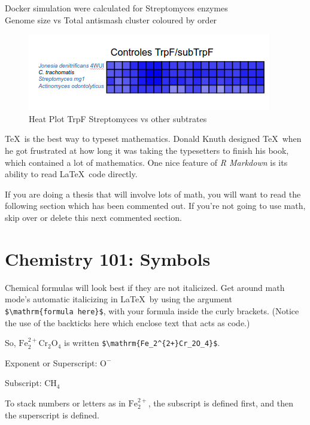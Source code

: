 \documentclass[12pt,twoside]{reedthesis}
\begin{document}
  Docker simulation were calculated for Streptomyces enzymes\\
  Genome size vs Total antismash cluster coloured by order
  
  \begin{figure}[h!tbp]
  \centering
  \includegraphics[angle = 0,scale = 0.6]{chapter2/TrpFHeatPlot.png}
  \caption[Heat Plot TrpF Streptomyces vs other subtrates]{\normalsize{Heat Plot TrpF Streptomyces vs other subtrates}}
  \label{fig:TrpFDocking}
  \end{figure}
  
  \TeX~is the best way to typeset mathematics. Donald Knuth designed
  \TeX~when he got frustrated at how long it was taking the typesetters to
  finish his book, which contained a lot of mathematics. One nice feature
  of \emph{R Markdown} is its ability to read \LaTeX~code directly.
  
  If you are doing a thesis that will involve lots of math, you will want
  to read the following section which has been commented out. If you're
  not going to use math, skip over or delete this next commented section.
  
  \section{Chemistry 101: Symbols}\label{chemistry-101-symbols}
  
  Chemical formulas will look best if they are not italicized. Get around
  math mode's automatic italicizing in \LaTeX~by using the argument
  \texttt{\$\textbackslash{}mathrm\{formula\ here\}\$}, with your formula
  inside the curly brackets. (Notice the use of the backticks here which
  enclose text that acts as code.)
  
  So, \(\mathrm{Fe_2^{2+}Cr_2O_4}\) is written
  \texttt{\$\textbackslash{}mathrm\{Fe\_2\^{}\{2+\}Cr\_2O\_4\}\$}.
  
  \noindent Exponent or Superscript: \(\mathrm{O^-}\)
  
  \noindent Subscript: \(\mathrm{CH_4}\)
  
  To stack numbers or letters as in \(\mathrm{Fe_2^{2+}}\), the subscript
  is defined first, and then the superscript is defined.
  
\end{document}

